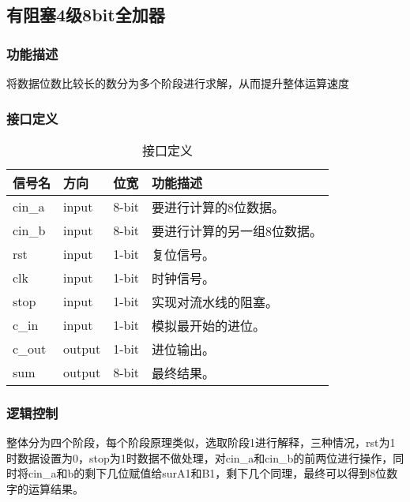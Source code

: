 \subsection{有阻塞4级8bit全加器}\label{sub:ctl}
\subsubsection{功能描述}
将数据位数比较长的数分为多个阶段进行求解，从而提升整体运算速度
\subsubsection{接口定义}
\begin{table}[htp]
	\caption{接口定义}\label{tab:signaldef2}
	\begin{center}
		\begin{tabular}{|l|l|l|p{6cm}|}
		\hline
		\textbf{信号名} & \textbf{方向} & \textbf{位宽} & \textbf{功能描述}\\ \hline \hline
		cin\_a	& input	& 8-bit	& 要进行计算的8位数据。\\ \hline
		cin\_b	& input	& 8-bit	& 要进行计算的另一组8位数据。\\ \hline
		rst		& input	& 1-bit	& 复位信号。\\ \hline
		clk		& input	& 1-bit	& 时钟信号。\\ \hline
		stop	& input	& 1-bit	& 实现对流水线的阻塞。\\ \hline
		c\_in	& input	& 1-bit	& 模拟最开始的进位。\\ \hline
		c\_out	& output	& 1-bit	& 进位输出。\\ \hline
		sum		& output	& 8-bit	& 最终结果。\\ \hline
		\end{tabular}
	\end{center}
\end{table}
	
\subsubsection{逻辑控制}
整体分为四个阶段，每个阶段原理类似，选取阶段1进行解释，三种情况，rst为1时数据设置为0，stop为1时数据不做处理，对cin\_a和cin\_b的前两位进行操作，同时将cin\_a和b的剩下几位赋值给surA1和B1，剩下几个同理，最终可以得到8位数字的运算结果。